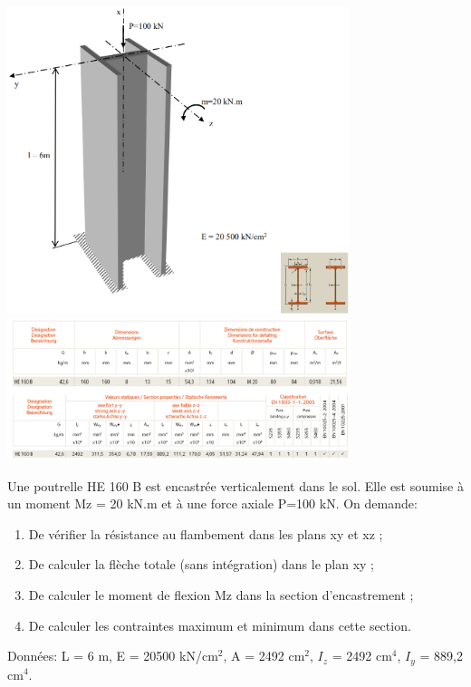 \documentclass[a4paper]{article}
\begin{document}
\begin{center}
\includegraphics[width=0.75\textwidth]{images/flambement03.PNG}
\includegraphics[width=0.75\textwidth]{images/flambement04.PNG}
\end{center}

Une poutrelle HE 160 B est encastrée verticalement dans le sol. Elle est soumise à un moment Mz = 20 kN.m et à une force axiale P=100 kN. On demande: 
\begin{enumerate}

    \item De vérifier la résistance au flambement dans les plans xy et xz ;
    \item De calculer la flèche totale (sans intégration) dans le plan xy ;
    \item De calculer le moment de flexion Mz dans la section d’encastrement ;
    \item De calculer les contraintes maximum et minimum dans cette section.

\end{enumerate}



Données: L = 6 m, E = 20500 kN/cm$^2$, A = 2492 cm$^2$, $ I_z $ = 2492 cm$^4$, $ I_y $ = 889,2 cm$^4$.
\end{document}
